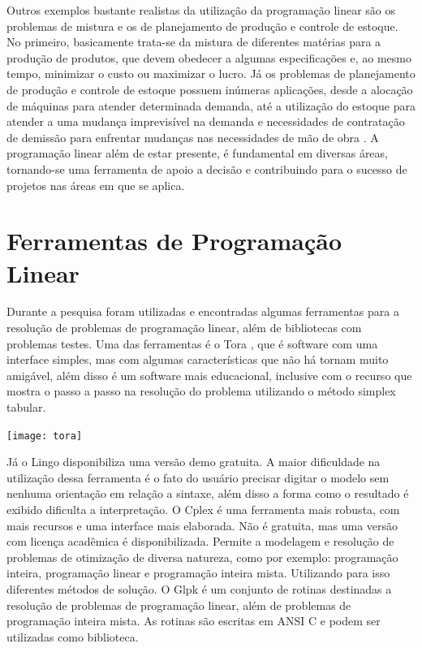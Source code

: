 Outros exemplos bastante realistas da utilização da programação linear são os problemas de mistura e os de planejamento de produção e controle de estoque. No primeiro, basicamente trata-se da mistura de diferentes matérias para a produção de produtos, que devem obedecer a algumas especificações e, ao mesmo tempo, minimizar o custo ou maximizar o lucro. Já os problemas de planejamento de produção e controle de estoque possuem inúmeras aplicações, desde a alocação de máquinas para atender determinada demanda, até a utilização do estoque para atender a uma mudança imprevisível na demanda e necessidades de contratação de demissão para enfrentar mudanças nas necessidades de mão de obra \cite{Taha}.
A programação linear além de estar presente, é fundamental em diversas áreas, tornando-se uma ferramenta de apoio a decisão e contribuindo para o sucesso de projetos nas áreas em que se aplica.

\section{Ferramentas de Programação Linear}
Durante a pesquisa foram utilizadas e encontradas algumas ferramentas para a resolução de problemas de programação linear, além de bibliotecas com problemas testes. 
Uma das ferramentas é o Tora \cite{Taha}, que é software com uma interface simples, mas com algumas características que não há tornam muito amigável, além disso é um software mais educacional, inclusive com o recurso que mostra o passo a passo na resolução do problema utilizando o método simplex tabular.

\begin{center}
	\texttt{[image: tora]}
\end{center}

Já o Lingo disponibiliza uma versão demo gratuita. A maior dificuldade na utilização dessa ferramenta é o fato do usuário precisar digitar o modelo sem nenhuma orientação em relação a sintaxe, além disso a forma como o resultado é exibido dificulta a interpretação.
O Cplex é uma ferramenta mais robusta, com mais recursos e uma interface mais elaborada. Não é gratuita, mas uma versão com licença acadêmica é disponibilizada. Permite a modelagem e resolução de problemas de otimização de diversa natureza, como por exemplo: programação inteira, programação linear e programação inteira mista. Utilizando para isso diferentes métodos de solução.
O Glpk é um conjunto de rotinas destinadas a resolução de problemas de programação linear, além de problemas de programação inteira mista. As rotinas são escritas em ANSI C e podem ser utilizadas como biblioteca.

